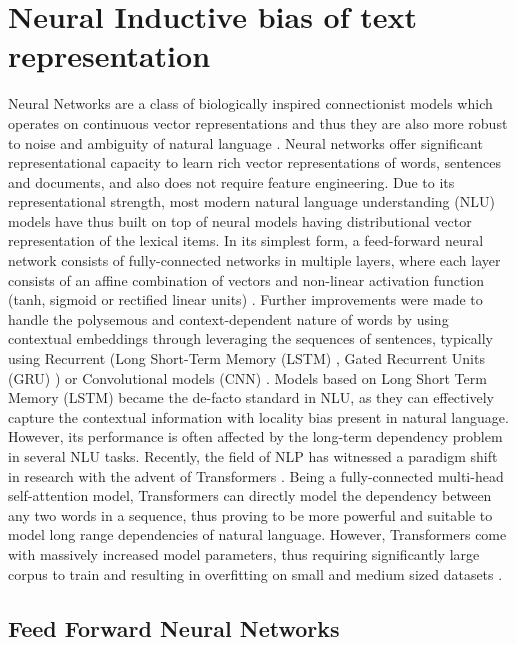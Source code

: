 \documentclass[letterpaper, 12pt]{report}
\begin{document}
\section{Neural Inductive bias of text representation}
\label{sec:bg_neural_nets}

Neural Networks are a class of biologically inspired connectionist models which operates on continuous vector representations and thus they are also more robust to noise and ambiguity of natural language \citep{wang2016machine,goodfellow2016deep}. Neural networks offer significant representational capacity to learn rich vector representations of words, sentences and documents, and also does not require feature engineering.
Due to its representational strength, most modern natural language understanding (NLU) models have thus built on top of neural models having distributional vector representation of the lexical items.
In its simplest form, a feed-forward neural network consists of fully-connected networks in multiple layers, where each layer consists of an affine combination of vectors and non-linear activation function (tanh, sigmoid or rectified linear units) \citep{rosenblatt1958perceptron,rumelhart1985learning,hinton2006fast,bengio2006greedy}.
Further improvements were made to handle the polysemous and context-dependent nature of words by using contextual embeddings through leveraging the sequences of sentences, typically using Recurrent (Long Short-Term Memory (LSTM) \citep{hochreiter1997long}, Gated Recurrent Units (GRU) \citep{cho2014learning}) or Convolutional models (CNN) \citep{kim-2014-convolutional}. Models based on Long Short Term Memory (LSTM) became the de-facto standard in NLU, as they can effectively capture the contextual information with locality bias present in natural language. However, its performance is often affected by the long-term dependency problem in several NLU tasks.
Recently, the field of NLP has witnessed a paradigm shift in research with the advent of Transformers \citep{vaswani-etal-2017-attention}. Being a fully-connected multi-head self-attention model, Transformers can directly model the dependency between any two words in a sequence, thus proving to be more powerful and suitable to model long range dependencies of natural language. However, Transformers come with massively increased model parameters, thus requiring significantly large corpus to train and resulting in overfitting on small and medium sized datasets \citep{radford2018improving}.


\subsection{Feed Forward Neural Networks}
\label{sec:bg_ffn}
\end{document}
